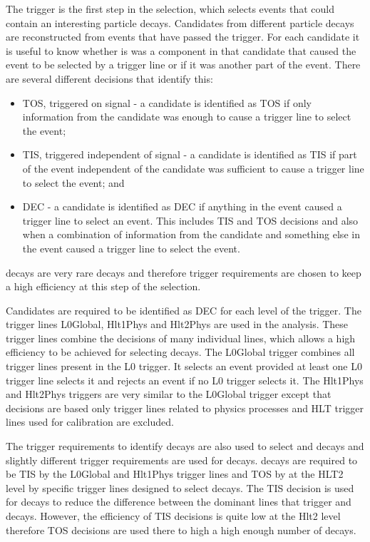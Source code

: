 The trigger is the first step in the selection, which selects events that could contain an interesting particle decays. %
Candidates from different particle decays are reconstructed from events that have passed the trigger. For each candidate it is useful to know whether is was a component in that candidate that caused the event to be selected by a trigger line or if it was another part of the event. There are several different decisions that identify this:
\begin{itemize}
\item TOS, triggered on signal - a candidate is identified as TOS if only information from the candidate was enough to cause a trigger line to select the event;
\item TIS, triggered independent of signal - a candidate is identified as TIS if part of the event independent of the candidate was sufficient to cause a trigger line to select the event; and
\item DEC - a candidate is identified as DEC if anything in the event caused a trigger line to select an event. This includes TIS and TOS decisions and also when a combination of information from the candidate and something else in the event caused a trigger line to select the event.
\end{itemize}

\bsmumu decays are very rare decays and therefore trigger requirements are chosen to keep a high efficiency at this step of the selection. 

Candidates are required to be identified as DEC for each level of the trigger. The trigger lines L0Global, Hlt1Phys and Hlt2Phys are used in the analysis. %
These trigger lines combine the decisions of many individual lines, which allows a high efficiency to be achieved for selecting \bsmumu decays. The L0Global trigger combines all trigger lines present in the L0 trigger. It selects an event provided at least one L0 trigger line selects it and rejects an event if no L0 trigger selects it. The Hlt1Phys and Hlt2Phys triggers are very similar to the L0Global trigger except that decisions are based only trigger lines related to physics processes and HLT trigger lines used for calibration are excluded.

The trigger requirements to identify \bmumu decays are also used to select \bujpsik and \bsjpsiphi decays and slightly different trigger requirements are used for \bhh decays. \bhh decays are required to be TIS by the L0Global and Hlt1Phys trigger lines and TOS by at the HLT2 level by specific trigger lines designed to select \bhh decays. The TIS decision is used for \bhh decays to reduce the difference between the dominant lines that trigger \bhh and \bmumu decays. However, the efficiency of TIS decisions is quite low at the Hlt2 level therefore TOS decisions are used there to high a high enough number of decays.

